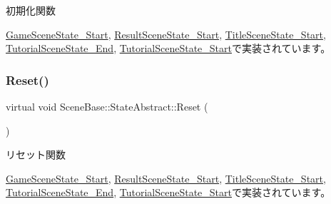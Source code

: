 初期化関数 



\mbox{\hyperlink{class_game_scene_state___start_ae921c57f349fbb2f00a197d40a3404b7}{Game\+Scene\+State\+\_\+\+Start}}, \mbox{\hyperlink{class_result_scene_state___start_a615c7e05efd2320b8956c5fd94398f55}{Result\+Scene\+State\+\_\+\+Start}}, \mbox{\hyperlink{class_title_scene_state___start_a3e785ba088ac3fd0989fd657e5d0cd34}{Title\+Scene\+State\+\_\+\+Start}}, \mbox{\hyperlink{class_tutorial_scene_state___end_a572e5687140ff5ac43789f90462c05a5}{Tutorial\+Scene\+State\+\_\+\+End}}, \mbox{\hyperlink{class_tutorial_scene_state___start_acd4cd7e4efeebffa9616d7ca31c7b1c0}{Tutorial\+Scene\+State\+\_\+\+Start}}で実装されています。

\mbox{\label{class_scene_base_1_1_state_abstract_a7e00d36fa023d91a0f205f12662584a0}} 
\subsubsection{\texorpdfstring{Reset()}{Reset()}}
{\footnotesize\ttfamily virtual void Scene\+Base\+::\+State\+Abstract\+::\+Reset (\begin{DoxyParamCaption}{ }\end{DoxyParamCaption})\hspace{0.3cm}{\ttfamily [pure virtual]}}



リセット関数 



\mbox{\hyperlink{class_game_scene_state___start_a59270f7b65613f580864ed8ea3056179}{Game\+Scene\+State\+\_\+\+Start}}, \mbox{\hyperlink{class_result_scene_state___start_a8f776a7b2d31451c434fb74ffdd65960}{Result\+Scene\+State\+\_\+\+Start}}, \mbox{\hyperlink{class_title_scene_state___start_af4dfe902a4391ca8f0cff5d1aa9507f8}{Title\+Scene\+State\+\_\+\+Start}}, \mbox{\hyperlink{class_tutorial_scene_state___end_ada1a87235a021b40f8eca96e31879227}{Tutorial\+Scene\+State\+\_\+\+End}}, \mbox{\hyperlink{class_tutorial_scene_state___start_a40bfdf7acd93b619138bf708adff31e4}{Tutorial\+Scene\+State\+\_\+\+Start}}で実装されています。

\mbox{\label{class_scene_base_1_1_state_abstract_a0d620f6a7f1bd8092cca2ccd7f70c299}} 
